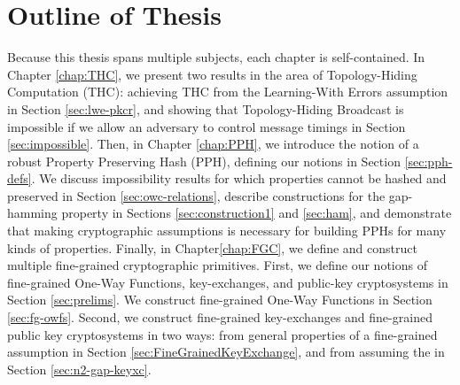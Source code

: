 \section{Outline of Thesis}
Because this thesis spans multiple subjects, each chapter is self-contained. In Chapter \ref{chap:THC}, we present two results in the area of Topology-Hiding Computation (THC): achieving THC from the Learning-With Errors assumption in Section \ref{sec:lwe-pkcr}, and showing that Topology-Hiding Broadcast is impossible if we allow an adversary to control message timings in Section \ref{sec:impossible}.
Then, in Chapter \ref{chap:PPH}, we introduce the notion of a robust Property Preserving Hash (PPH), defining our notions in Section \ref{sec:pph-defs}. We discuss impossibility results for which properties cannot be hashed and preserved in Section \ref{sec:owc-relations}, describe constructions for the gap-hamming property in Sections \ref{sec:construction1} and \ref{sec:ham}, and demonstrate that making cryptographic assumptions is necessary for building PPHs for many kinds of properties.
Finally, in Chapter\ref{chap:FGC}, we define and construct multiple fine-grained cryptographic primitives. First, we define our notions of fine-grained One-Way Functions, key-exchanges, and public-key cryptosystems in Section \ref{sec:prelims}. We construct fine-grained One-Way Functions in Section \ref{sec:fg-owfs}. Second, we construct fine-grained key-exchanges and fine-grained public key cryptosystems in two ways: from general properties of a fine-grained assumption in Section \ref{sec:FineGrainedKeyExchange}, and from assuming the \strongzkc in Section \ref{sec:n2-gap-keyxc}.